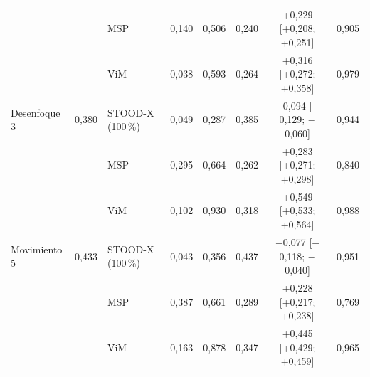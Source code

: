 \begin{table}[tbp]
\begin{tabular}{lllccccc}
 &  & MSP & 0{,}140 & 0{,}506 & 0{,}240 & +0{,}229 {\tiny [+0{,}208; +0{,}251]} & 0{,}905 \\
 &  & ViM & 0{,}038 & 0{,}593 & 0{,}264 & +0{,}316 {\tiny [+0{,}272; +0{,}358]} & 0{,}979 \\
\midrule
Desenfoque 3 & 0{,}380 & STOOD-X (100\,\%) & 0{,}049 & 0{,}287 & 0{,}385 & $-$0{,}094 {\tiny [$-$0{,}129; $-$0{,}060]} & 0{,}944 \\
 &  & MSP & 0{,}295 & 0{,}664 & 0{,}262 & +0{,}283 {\tiny [+0{,}271; +0{,}298]} & 0{,}840 \\
 &  & ViM & 0{,}102 & 0{,}930 & 0{,}318 & +0{,}549 {\tiny [+0{,}533; +0{,}564]} & 0{,}988 \\
\midrule
Movimiento 5 & 0{,}433 & STOOD-X (100\,\%) & 0{,}043 & 0{,}356 & 0{,}437 & $-$0{,}077 {\tiny [$-$0{,}118; $-$0{,}040]} & 0{,}951 \\
 &  & MSP & 0{,}387 & 0{,}661 & 0{,}289 & +0{,}228 {\tiny [+0{,}217; +0{,}238]} & 0{,}769 \\
 &  & ViM & 0{,}163 & 0{,}878 & 0{,}347 & +0{,}445 {\tiny [+0{,}429; +0{,}459]} & 0{,}965 \\
\bottomrule
\end{tabular}
\end{table}
